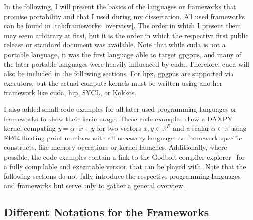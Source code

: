 
In the following, I will present the basics of the languages or frameworks that promise portability and that I used during my dissertation. 
All used frameworks can be found in \autoref{tab:frameworks_overview}. 
The order in which I present them may seem arbitrary at first, but it is the order in which the respective first public release or standard document was available. 
Note that while \gls{cuda} is not a portable language, it was the first language able to target \glspl{gpgpu}, and many of the later portable languages were heavily influenced by \gls{cuda}. 
Therefore, \gls{cuda} will also be included in the following sections. 
For \gls{hpx}, \glspl{gpgpu} are supported via executors, but the actual compute kernels must be written using another framework like \gls{cuda}, \gls{hip}, SYCL, or Kokkos. 

I also added small code examples for all later-used programming languages or frameworks to show their basic usage. 
These code examples show a DAXPY kernel computing $y = \alpha \cdot x + y$ for two vectors $x, y \in \mathbb{R}^N$ and a scalar $\alpha \in \mathbb{R}$ using FP64 floating point numbers with all necessary language- or framework-specific constructs, like memory operations or kernel launches. 
Additionally, where possible, the code examples contain a link to the Godbolt compiler explorer~\cite{godbolt_compiler-explorercompiler-explorer_2025} for a fully compilable and executable version that can be played with. 
Note that the following sections do not fully introduce the respective programming languages and frameworks but serve only to gather a general overview. 












\subsection{Different Notations for the Frameworks}
\label{sec:frameworks:notation}

